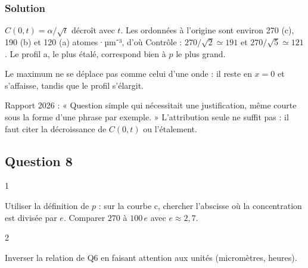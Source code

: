 \documentclass[11pt,a4paper]{article}
\newcommand{\equationajustee}[1]{%
  \sbox{\boiteequation}{$\displaystyle #1$}%
  \ifdim\wd\boiteequation>\linewidth
    \[\resizebox{\linewidth}{!}{\usebox{\boiteequation}}\]%
  \else
    \[#1\]%
  \fi}
\begin{document}
\hypertarget{solution-6}{%
\subsubsection{Solution}\label{solution-6}}

\(C(0,t)=\alpha/\sqrt t\) décroît avec \(t\). Les ordonnées à l'origine sont environ 270 (c), 190 (b) et 120 (a) atomes·µm⁻³, d'où
\equationajustee{\boxed{\begin{aligned}{}&\mathbf c : 1\ \mathrm h\\
&\mathbf b : 2\ \mathrm h\\
&\mathbf a : 5\ \mathrm h
\end{aligned}}}
Contrôle : \(270/\sqrt2\simeq191\) et \(270/\sqrt5\simeq121\). Le profil a, le plus étalé, correspond bien à \(p\) le plus grand.

\begin{piege}

Le maximum ne se déplace pas comme celui d'une onde : il reste en \(x=0\) et s'affaisse, tandis que le profil s'élargit.

\end{piege}

\begin{jury}

Rapport 2026 : « Question simple qui nécessitait une justification, même courte sous la forme d'une phrase par exemple. » L'attribution seule ne suffit pas : il faut citer la décroissance de \(C(0,t)\) ou l'étalement.

\end{jury}

\hypertarget{question-8}{%
\subsection{Question 8}\label{question-8}}

\begin{indication}{1}

Utiliser la définition de \(p\) : sur la courbe c, chercher l'abscisse où la concentration est divisée par \(e\). Comparer \(270\) à \(100\,e\) avec \(e\approx2{,}7\).

\end{indication}

\begin{indication}{2}

Inverser la relation de Q6 en faisant attention aux unités (micromètres, heures).

\end{indication}
\end{document}
